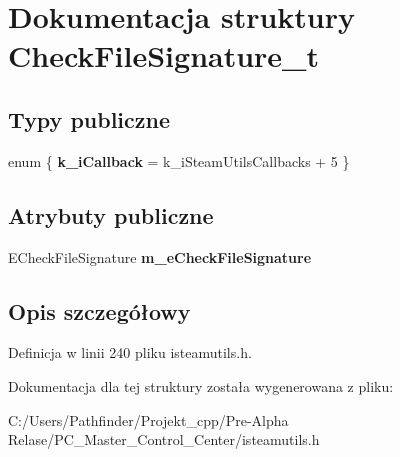 \hypertarget{struct_check_file_signature__t}{}\section{Dokumentacja struktury Check\+File\+Signature\+\_\+t}
\label{struct_check_file_signature__t}
\subsection*{Typy publiczne}
\begin{DoxyCompactItemize}
\item 
\mbox{\label{struct_check_file_signature__t_a61a6c8448845734bcbd883c694a5f55d}} 
enum \{ {\bfseries k\+\_\+i\+Callback} = k\+\_\+i\+Steam\+Utils\+Callbacks + 5
 \}
\end{DoxyCompactItemize}
\subsection*{Atrybuty publiczne}
\begin{DoxyCompactItemize}
\item 
\mbox{\label{struct_check_file_signature__t_a9b8fba3c51d8f787c56d47c6942155d1}} 
E\+Check\+File\+Signature {\bfseries m\+\_\+e\+Check\+File\+Signature}
\end{DoxyCompactItemize}


\subsection{Opis szczegółowy}


Definicja w linii 240 pliku isteamutils.\+h.



Dokumentacja dla tej struktury została wygenerowana z pliku\+:\begin{DoxyCompactItemize}
\item 
C\+:/\+Users/\+Pathfinder/\+Projekt\+\_\+cpp/\+Pre-\/\+Alpha Relase/\+P\+C\+\_\+\+Master\+\_\+\+Control\+\_\+\+Center/isteamutils.\+h\end{DoxyCompactItemize}

